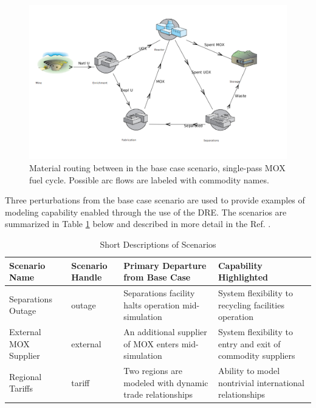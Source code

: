\begin{figure}
  \begin{center}
    \includegraphics[width=0.75\columnwidth]{base_case_fc}
    \caption[]{
      \label{fig:base}
      Material routing between in the base case scenario, single-pass MOX fuel
      cycle. Possible arc flows are labeled with commodity names.}
  \end{center}
\end{figure}

Three perturbations from the base case scenario are used to provide examples of
modeling capability enabled through the use of the DRE. The scenarios are
summarized in Table \ref{scenarios} below and described in more detail in the
Ref. .

\begin{table}[]
\centering
\caption{Short Descriptions of Scenarios}
\label{scenarios}
\begin{tabularx}{\textwidth}{|p{2cm}|p{2cm}|X|X|}
\hline
\textbf{Scenario  Name} & \textbf{Scenario Handle} & \textbf{Primary Departure from Base Case}                & \textbf{Capability Highlighted}                             \\ \hline
Separations Outage      & outage                   & Separations facility halts operation mid-simulation      & System flexibility to recycling facilities operation        \\ \hline
External MOX Supplier   & external                 & An additional supplier of MOX enters mid-simulation      & System flexibility to entry and exit of commodity suppliers \\ \hline
Regional Tariffs        & tariff                   & Two regions are modeled with dynamic trade relationships & Ability to model nontrivial international relationships     \\ \hline
\end{tabularx}
\end{table}

